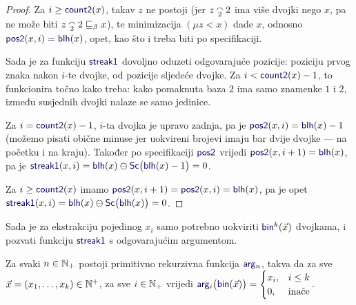 \begin{proof}
Za $i\ge\f{count2}(x)$, takav $z$ ne postoji (jer $z\conc22$ ima više dvojki nego $x$, pa ne može biti $z\conc22\sqsubseteq_\beta x$), te minimizacija $(\mu z<x)$ dade $x$, odnosno $\f{pos2}(x,i)=\f{blh}(x)$, opet, kao što i treba biti po specifikaciji.

Sada je za funkciju $\f{streak1}$ dovoljno oduzeti odgovarajuće pozicije: poziciju prvog znaka nakon $i$-te dvojke, od pozicije sljedeće dvojke. Za $i<\f{count2}(x)-1$, to funkcionira točno kako treba: kako pomaknuta baza $2$ ima samo znamenke $1$ i $2$, između susjednih dvojki nalaze se samo jedinice.

Za $i=\f{count2}(x)-1$, $i$-ta dvojka je upravo zadnja, pa je $\f{pos2}(x,i)=\f{blh}(x)-1$ (možemo pisati obične minuse jer uokvireni brojevi imaju bar dvije dvojke --- na početku i na kraju). Također po specifikaciji $\f{pos2}$ vrijedi $\f{pos2}(x,i+1)=\f{blh}(x)$, pa je $\f{streak1}(x,i)=\f{blh}(x)\ominus\f{Sc}\bigl(\f{blh}(x)-1\bigr)=0$.

Za $i\ge\f{count2}(x)$ imamo $\f{pos2}(x,i+1)=\f{pos2}(x,i)=\f{blh}(x)$, pa je opet $\f{streak1}(x,i)=\f{blh}(x)\ominus\f{Sc}\bigl(\f{blh}(x)\bigr)=0$.
\end{proof}


Sada je za ekstrakciju pojedinog $x_i$ samo potrebno uokviriti $\f{bin}^k(\vec x)$ dvojkama, i pozvati funkciju $\f{streak1}$ s odgovarajućim argumentom.

\begin{propozicija}[{name=[primitivna rekurzivnost ekstrakcije argumenata]}]\label{pp:argnprn}
Za svaki $n\in{\mathbb N}_+$ postoji primitivno rekurzivna funkcija $\f{arg}_n$, takva da za sve $\vec x=(x_1,\dotsc,x_k)\in{\mathbb N}^+$, za sve $i\in{\mathbb N}_+$ vrijedi $\f{arg}_i\bigl(\f{bin}(\vec x)\bigr)=\begin{cases}
x_i,&i\le k\\
0,&\text{inače}
\end{cases}$.
\end{propozicija}


